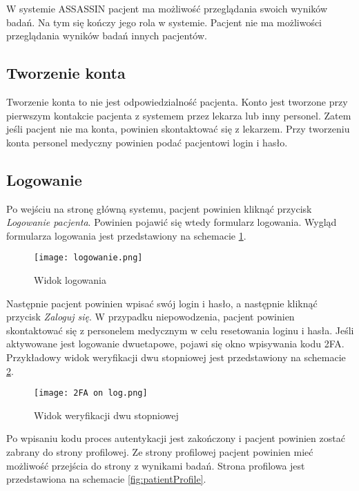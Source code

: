 \documentclass{documentation}
\begin{document}
W systemie ASSASSIN pacjent ma możliwość przeglądania swoich wyników badań.
Na tym się kończy jego rola w systemie.
Pacjent nie ma możliwości przeglądania wyników badań innych pacjentów.

\subsection{Tworzenie konta}

Tworzenie konta to nie jest odpowiedzialność pacjenta.
Konto jest tworzone przy pierwszym kontakcie pacjenta z systemem przez lekarza lub inny personel.
Zatem jeśli pacjent nie ma konta, powinien skontaktować się z lekarzem.
Przy tworzeniu konta personel medyczny powinien podać pacjentowi login i hasło.

\subsection{Logowanie}

Po wejściu na stronę główną systemu, pacjent powinien kliknąć przycisk \textit{Logowanie pacjenta}.
Powinien pojawić się wtedy formularz logowania.
Wygląd formularza logowania jest przedstawiony na schemacie \ref{fig:login}.

\begin{figure}[h]
    \centering
    \texttt{[image: logowanie.png]}
    \caption{Widok logowania\label{fig:login}}
\end{figure}

Następnie pacjent powinien wpisać swój login i hasło, a następnie kliknąć przycisk \textit{Zaloguj się}.
W przypadku niepowodzenia, pacjent powinien skontaktować się z personelem medycznym w celu resetowania loginu i hasła.
Jeśli aktywowane jest logowanie dwuetapowe, pojawi się okno wpisywania kodu 2FA.
Przykładowy widok weryfikacji dwu stopniowej jest przedstawiony na schemacie \ref{fig:2FA}.

\begin{figure}[h]
    \centering
    \texttt{[image: 2FA on log.png]}
    \caption{Widok weryfikacji dwu stopniowej\label{fig:2FA}}
\end{figure}

Po wpisaniu kodu proces autentykacji jest zakończony i pacjent powinien zostać zabrany do strony profilowej.
Ze strony profilowej pacjent powinien mieć możliwość przejścia do strony z wynikami badań.
Strona profilowa jest przedstawiona na schemacie \ref{fig:patientProfile}.
\end{document}
